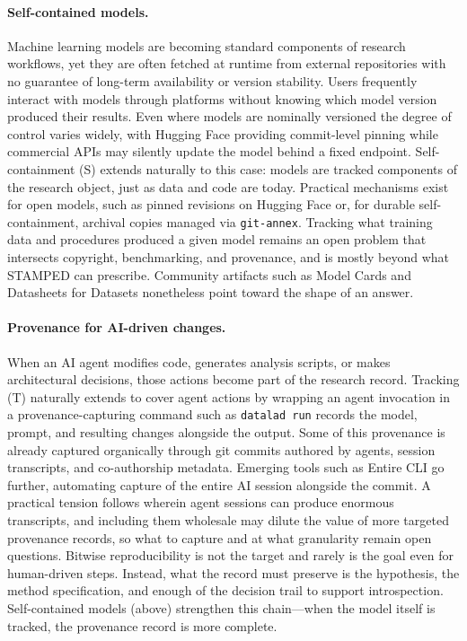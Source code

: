\documentclass{article}
\begin{document}
\paragraph{Self-contained models.}
Machine learning models are becoming standard components of research workflows, yet they are often fetched at runtime from external repositories with no guarantee of long-term availability or version stability.
Users frequently interact with models through platforms without knowing which model version produced their results.
Even where models are nominally versioned the degree of control varies widely, with Hugging Face providing commit-level pinning while commercial APIs may silently update the model behind a fixed endpoint.
Self-containment (S) extends naturally to this case: models are tracked components of the research object, just as data and code are today.
Practical mechanisms exist for open models, such as pinned revisions on Hugging Face or, for durable self-containment, archival copies managed via \texttt{git-annex}.
Tracking what training data and procedures produced a given model remains an open problem that intersects copyright, benchmarking, and provenance, and is mostly beyond what STAMPED can prescribe.
Community artifacts such as Model Cards\cite{mitchell_model_2019} and Datasheets for Datasets\cite{gebru_datasheets_2021} nonetheless point toward the shape of an answer.

\paragraph{Provenance for AI-driven changes.}
When an AI agent modifies code, generates analysis scripts, or makes architectural decisions, those actions become part of the research record.
Tracking (T) naturally extends to cover agent actions by wrapping an agent invocation in a provenance-capturing command such as \texttt{datalad run} records the model, prompt, and resulting changes alongside the output.
Some of this provenance is already captured organically through git commits authored by agents, session transcripts, and co-authorship metadata.
Emerging tools such as Entire CLI\cite{entire_entire_2026} go further, automating capture of the entire AI session alongside the commit.
A practical tension follows wherein agent sessions can produce enormous transcripts, and including them wholesale may dilute the value of more targeted provenance records, so what to capture and at what granularity remain open questions.
Bitwise reproducibility is not the target and rarely is the goal even for human-driven steps.
Instead, what the record must preserve is the hypothesis, the method specification, and enough of the decision trail to support introspection.
Self-contained models (above) strengthen this chain---when the model itself is tracked, the provenance record is more complete.
\end{document}
